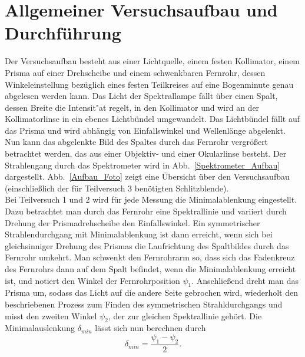 \documentclass[12pt,a4paper]{article}
\begin{document}
\section{Allgemeiner Versuchsaufbau und Durchführung}
Der Versuchsaufbau besteht aus einer Lichtquelle, einem festen Kollimator, einem Prisma auf einer Drehscheibe und einem schwenkbaren Fernrohr, dessen Winkeleinstellung bezüglich eines festen Teilkreises auf eine Bogenminute genau abgelesen werden kann. Das Licht der Spektrallampe fällt über einen Spalt, dessen Breite die Intensit"at regelt, in den Kollimator und wird an der Kollimatorlinse in ein ebenes Lichtbündel umgewandelt. Das Lichtbündel fällt auf das Prisma und wird abhängig von Einfallswinkel und Wellenlänge abgelenkt. Nun kann das abgelenkte Bild des Spaltes durch das Fernrohr vergrößert betrachtet werden, das aus einer Objektiv- und einer Okularlinse besteht. Der Strahlengang durch das Spektrometer wird in Abb.~\ref{Spektrometer_Aufbau} dargestellt. Abb.~\ref{Aufbau_Foto} zeigt eine Übersicht über den Versuchsaufbau (einschließlich der für Teilversuch 3 benötigten Schlitzblende).\\
Bei Teilversuch 1 und 2 wird für jede Messung die Minimalablenkung eingestellt. Dazu betrachtet man durch das Fernrohr eine Spektrallinie und variiert durch Drehung der Prismadrehscheibe den Einfallswinkel. Ein symmetrischer Strahlendurchgang mit Minimalablenkung ist dann erreicht, wenn sich bei gleichsinniger Drehung des Prismas die Laufrichtung des Spaltbildes durch das Fernrohr umkehrt. Man schwenkt den Fernrohrarm so, dass sich das Fadenkreuz des Fernrohrs dann auf dem Spalt befindet, wenn die Minimalablenkung erreicht ist, und notiert den Winkel der Fernrohrposition $\psi_1$. Anschließend dreht man das Prisma um, sodass das Licht auf die andere Seite gebrochen wird, wiederholt den beschriebenen Prozess zum Finden des symmetrischen Strahldurchgangs und misst den zweiten Winkel $\psi_2$, der zur gleichen Spektrallinie gehört. Die Minimalauslenkung $\delta_{min}$ lässt sich nun berechnen durch
\begin{equation}\label{eq:delmin_aus_psi}
\delta_{min}=\frac{\psi_1-\psi_2}{2}.
\end{equation}
\end{document}
